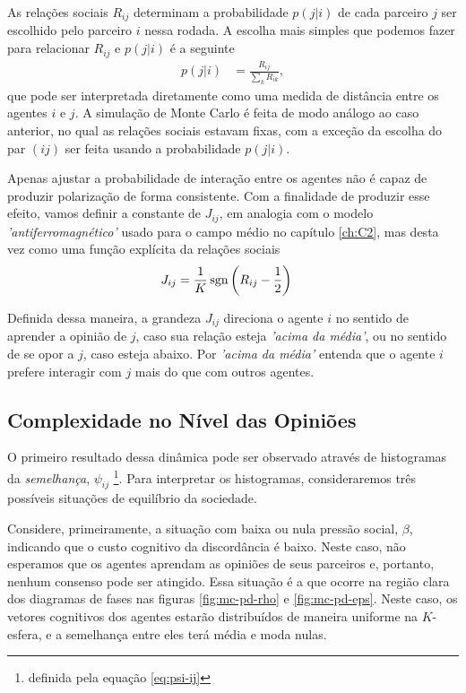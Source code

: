 As relações sociais $R_{ij}$ determinam a probabilidade $p(j|i)$ de cada parceiro $j$ ser escolhido pelo parceiro $i$ nessa rodada.
A escolha mais simples que podemos fazer para relacionar $R_{ij}$ e $p(j|i)$ é a seguinte
\begin{align}
  p(j|i) & = \frac{R_{ij}}{\sum_{k}R_{ik}}, \label{eq:pij-linear}
\end{align}
que pode ser interpretada diretamente como uma medida de distância \footnotemark entre os agentes $i$ e $j$. 
A simulação de Monte Carlo é feita de modo análogo ao caso anterior, no qual as relações sociais estavam fixas, com a exceção da escolha do par $(ij)$ ser feita usando a probabilidade $p(j|i)$.

Apenas ajustar a probabilidade de interação entre os agentes não é capaz de produzir polarização de forma consistente.
Com a finalidade de produzir esse efeito, vamos definir a constante de $J_{ij}$, em analogia com o modelo \emph{'antiferromagnético'} usado para o campo médio no capítulo \ref{ch:C2}, mas desta vez como uma função explícita da relações sociais
\begin{align}
    J_{ij} & = \frac{1}{K}\,\sgn\inpr{R_{ij} - \half} \label{eq:Jij-Rij}
\end{align}

Definida dessa maneira, a grandeza $J_{ij}$ direciona o agente $i$ no sentido de aprender a opinião de $j$, caso sua relação esteja \emph{'acima da média'}, ou no sentido de se opor a $j$, caso esteja abaixo.
Por \emph{'acima da média'} entenda que o agente $i$ prefere interagir com $j$ mais do que com outros agentes.

\subsection{Complexidade no Nível das Opiniões}

O primeiro resultado dessa dinâmica pode ser observado através de histogramas da \emph{semelhança}, $\psi_{ij}$ \footnote{definida pela equação \eqref{eq:psi-ij}}.
Para interpretar os histogramas, consideraremos três possíveis situações de equilíbrio da sociedade.

Considere, primeiramente, a situação com baixa ou nula pressão social, $\beta$, indicando que o custo cognitivo da discordância é baixo.
Neste caso, não esperamos que os agentes aprendam as opiniões de seus parceiros e, portanto, nenhum consenso pode ser atingido.
Essa situação é a que ocorre na região clara dos diagramas de fases nas figuras \ref{fig:mc-pd-rho} e \ref{fig:mc-pd-eps}.
Neste caso, os vetores cognitivos dos agentes estarão distribuídos de maneira uniforme na $K$-esfera, e a semelhança entre eles terá média e moda nulas.

